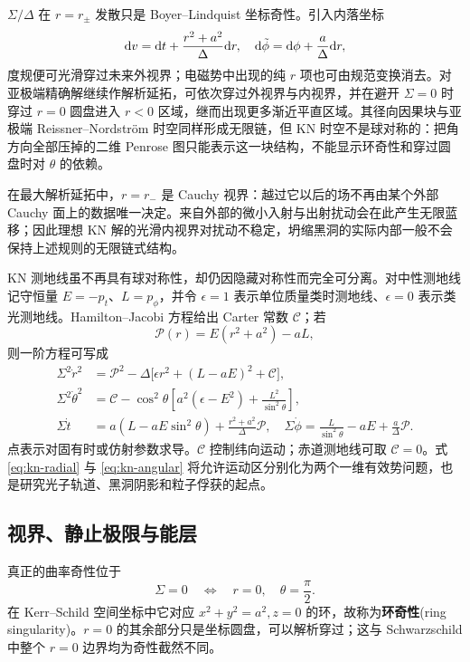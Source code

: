 $\Sigma/\Delta$ 在 $r=r_\pm$ 发散只是 Boyer--Lindquist 坐标奇性。引入内落坐标
\begin{equation}\label{eq:kn-ingoing}
    \dd v=\dd t+\frac{r^2+a^2}{\Delta}\dd r,
    \quad
    \dd\tilde\phi=\dd\phi+\frac{a}{\Delta}\dd r,
\end{equation}
度规便可光滑穿过未来外视界；电磁势中出现的纯 $r$ 项也可由规范变换消去。对亚极端精确解继续作解析延拓，可依次穿过外视界与内视界，并在避开 $\Sigma=0$ 时穿过 $r=0$ 圆盘进入 $r<0$ 区域，继而出现更多渐近平直区域。其径向因果块与亚极端 Reissner--Nordstr\"om 时空同样形成无限链，但 KN 时空不是球对称的：把角方向全部压掉的二维 Penrose 图只能表示这一块结构，不能显示环奇性和穿过圆盘时对 $\theta$ 的依赖。

在最大解析延拓中，$r=r_-$ 是 Cauchy 视界：越过它以后的场不再由某个外部 Cauchy 面上的数据唯一决定。来自外部的微小入射与出射扰动会在此产生无限蓝移；因此理想 KN 解的光滑内视界对扰动不稳定，坍缩黑洞的实际内部一般不会保持上述规则的无限链式结构。

KN 测地线虽不再具有球对称性，却仍因隐藏对称性而完全可分离。对中性测地线记守恒量 $E=-p_t$、$L=p_\phi$，并令 $\epsilon=1$ 表示单位质量类时测地线、$\epsilon=0$ 表示类光测地线。Hamilton--Jacobi 方程给出 Carter 常数 $\mathcal C$；若
\[
    \mathcal P(r)=E(r^2+a^2)-aL,
\]
则一阶方程可写成
\begin{align}
    \Sigma^2\dot r^2&=\mathcal P^2
      -\Delta\bigl[\epsilon r^2+(L-aE)^2+\mathcal C\bigr],\label{eq:kn-radial}\\
    \Sigma^2\dot\theta^2&=\mathcal C-\cos^2\theta
      \left[a^2(\epsilon-E^2)+\frac{L^2}{\sin^2\theta}\right],\label{eq:kn-angular}\\
    \Sigma\dot t&=a(L-aE\sin^2\theta)
      +\frac{r^2+a^2}{\Delta}\mathcal P,\quad
    \Sigma\dot\phi=\frac{L}{\sin^2\theta}-aE
      +\frac{a}{\Delta}\mathcal P .
\end{align}
点表示对固有时或仿射参数求导。$\mathcal C$ 控制纬向运动；赤道测地线可取 $\mathcal C=0$。式 \eqref{eq:kn-radial} 与 \eqref{eq:kn-angular} 将允许运动区分别化为两个一维有效势问题，也是研究光子轨道、黑洞阴影和粒子俘获的起点。

\subsection{视界、静止极限与能层}

真正的曲率奇性位于
\[
    \Sigma=0\quad\Longleftrightarrow\quad r=0,
    \quad\theta=\frac{\pi}{2}.
\]
在 Kerr--Schild 空间坐标中它对应 $x^2+y^2=a^2,z=0$ 的环，故称为\textbf{环奇性}(ring singularity)。$r=0$ 的其余部分只是坐标圆盘，可以解析穿过；这与 Schwarzschild 中整个 $r=0$ 边界均为奇性截然不同。

